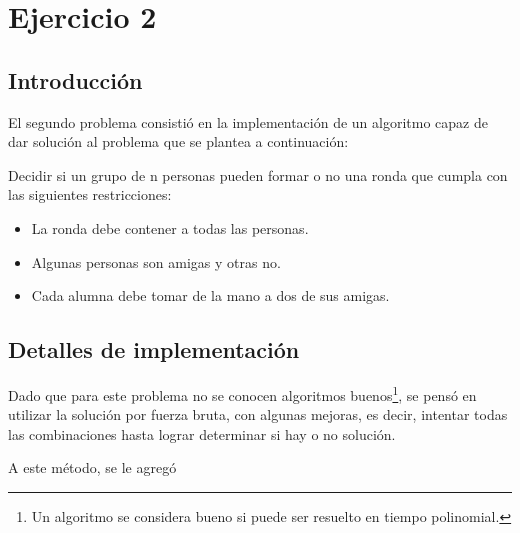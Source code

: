 \section*{Ejercicio 2}

\subsection*{Introducción}
	El segundo problema consistió en la implementación de un algoritmo capaz de dar solución al problema que se plantea a continuación:

	 Decidir si un grupo de n personas pueden formar o no una ronda que cumpla con las siguientes restricciones:
	\begin{itemize}
	      \item La ronda debe contener a todas las personas.
	      \item Algunas personas son amigas y otras no. 
	      \item Cada alumna debe tomar de la mano a dos de sus amigas.
	 
	\end{itemize}

	

\subsection*{Detalles de implementación}
	Dado que para este problema no se conocen algoritmos buenos\footnote{Un algoritmo se considera bueno si puede ser resuelto en tiempo polinomial.},
	se pensó en utilizar la solución por fuerza bruta, con algunas mejoras, es decir, intentar todas las combinaciones hasta lograr determinar si hay o no solución.
	
	A este método, se le agregó

